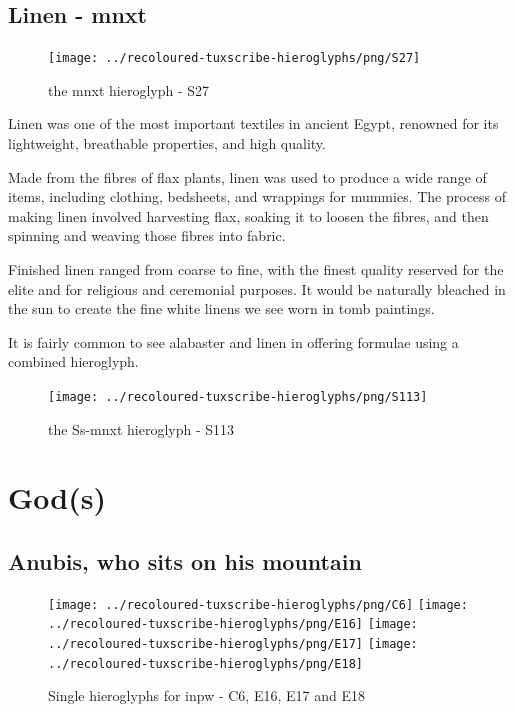 \subsection*{Linen - mnxt}

\begin{figure} [H]
	\centering
	\texttt{[image: ../recoloured-tuxscribe-hieroglyphs/png/S27]}
	\caption{the mnxt hieroglyph - S27}
\end{figure}

Linen was one of the most important textiles in ancient Egypt, renowned for its lightweight, breathable properties, and high quality.

Made from the fibres of flax plants, linen was used to produce a wide range of items, including clothing, bedsheets, and wrappings for mummies. The process of making linen involved harvesting flax, soaking it to loosen the fibres, and then spinning and weaving those fibres into fabric.

Finished linen ranged from coarse to fine, with the finest quality reserved for the elite and for religious and ceremonial purposes. It would be naturally bleached in the sun to create the fine white linens we see worn in tomb paintings.

It is fairly common to see alabaster and linen in offering formulae using a combined hieroglyph.

\begin{figure} [H]
	\centering
	\texttt{[image: ../recoloured-tuxscribe-hieroglyphs/png/S113]}
	\caption{the Ss-mnxt hieroglyph - S113}
\end{figure}

\section*{God(s)}

\subsection*{Anubis, who sits on his mountain}

\begin{figure} [H]
	\centering
	\texttt{[image: ../recoloured-tuxscribe-hieroglyphs/png/C6]}
	\hspace{0.03125\textwidth}
	\texttt{[image: ../recoloured-tuxscribe-hieroglyphs/png/E16]}
	\texttt{[image: ../recoloured-tuxscribe-hieroglyphs/png/E17]}
	\texttt{[image: ../recoloured-tuxscribe-hieroglyphs/png/E18]}
	\caption{Single hieroglyphs for inpw - C6, E16, E17 and E18}
\end{figure}

